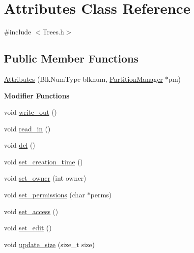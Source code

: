 \hypertarget{class_attributes}{}\section{Attributes Class Reference}
\label{class_attributes}


{\ttfamily \#include $<$Trees.\+h$>$}

\subsection*{Public Member Functions}
\begin{DoxyCompactItemize}
\item 
\mbox{\hyperlink{class_attributes_a0d6b154029e34f811f0930806768f022}{Attributes}} (Blk\+Num\+Type blknum, \mbox{\hyperlink{class_partition_manager}{Partition\+Manager}} $\ast$pm)
\end{DoxyCompactItemize}
\begin{Indent}\textbf{ Modifier Functions}\par
\begin{DoxyCompactItemize}
\item 
void \mbox{\hyperlink{class_attributes_a7066f30d97317f75a02a137d09a2065e}{write\+\_\+out}} ()
\item 
void \mbox{\hyperlink{class_attributes_ac33fbd6871ef707878690be92b9fc7ec}{read\+\_\+in}} ()
\item 
void \mbox{\hyperlink{class_attributes_acf28e724c914f066ecdae788d95b3212}{del}} ()
\item 
void \mbox{\hyperlink{class_attributes_a4c518dae976d9186337f655f7b09cecc}{set\+\_\+creation\+\_\+time}} ()
\item 
void \mbox{\hyperlink{class_attributes_affdf3abb52a45ac3c9051bafd0da9e7e}{set\+\_\+owner}} (int owner)
\item 
void \mbox{\hyperlink{class_attributes_aac8ca00f98b22280df69f62e42b72b8b}{set\+\_\+permissions}} (char $\ast$perms)
\item 
void \mbox{\hyperlink{class_attributes_af2ce6f6dce652a7adfeba3f28b4ee0bc}{set\+\_\+access}} ()
\item 
void \mbox{\hyperlink{class_attributes_a88674bf65fba99d32870c7fa48edf135}{set\+\_\+edit}} ()
\item 
void \mbox{\hyperlink{class_attributes_a3983ec45af66e9b19367222092b7df6c}{update\+\_\+size}} (size\+\_\+t size)
\end{DoxyCompactItemize}
\end{Indent}
